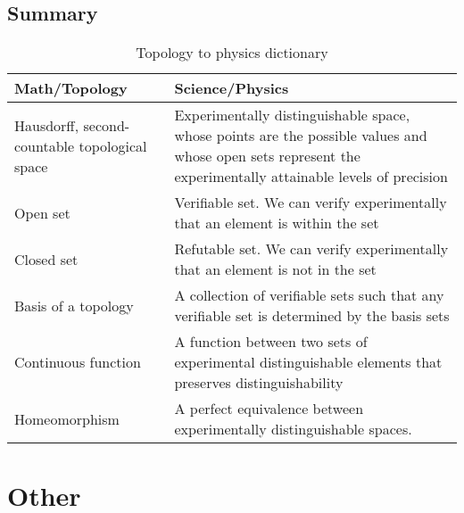 \documentclass[11pt,letterpaper,fleqn]{memoir} %
\begin{document}
\section{Summary}

\begin{table}[h]
	\centering
\begin{tabular}{p{} p{}}
	Math/Topology & Science/Physics \\ 
	\hline 
	Hausdorff, second-countable topological space & Experimentally distinguishable space, whose points are the possible values and whose open sets represent the experimentally attainable levels of precision \\
	Open set & Verifiable set. We can verify experimentally that an element is within the set  \\ 
	Closed set & Refutable set. We can verify experimentally that an element is not in the set \\ 
	Basis of a topology & A collection of verifiable sets such that any verifiable set is determined by the basis sets\\
	Continuous \newline function &  A function between two sets of experimental distinguishable elements that preserves distinguishability \\
	Homeomorphism &  A perfect equivalence between experimentally distinguishable spaces. \\
\end{tabular} 
\caption{Topology to physics dictionary}
\end{table}


\chapter{Other}

	
\end{document}
